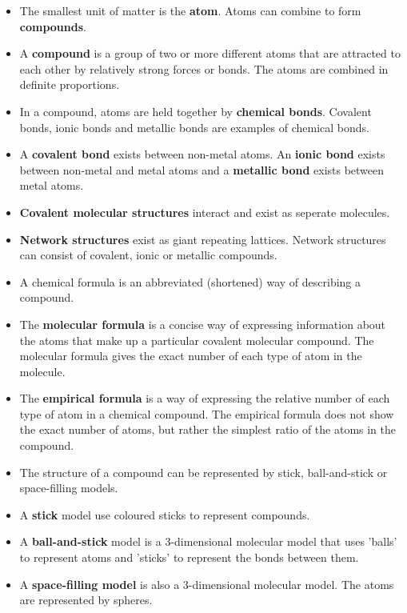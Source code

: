 \begin{itemize}[noitemsep]
\item The smallest unit of matter is the \textbf{atom}. Atoms can combine to form \textbf{compounds}.
\item A \textbf{compound} is a group of two or more different atoms that are attracted to each other by relatively strong forces or bonds. The atoms are combined in definite proportions.
\item In a compound, atoms are held together by \textbf{chemical bonds}. Covalent bonds, ionic bonds and metallic bonds are examples of chemical bonds.
\item A \textbf{covalent bond} exists between non-metal atoms. An \textbf{ionic bond} exists between non-metal and metal atoms and a \textbf{metallic bond} exists between metal atoms.
\item \textbf{Covalent molecular structures} interact and exist as seperate molecules.
\item \textbf{Network structures} exist as giant repeating lattices. Network structures can consist of covalent, ionic or metallic compounds. 
\item A chemical formula is an abbreviated (shortened) way of describing a compound.
\item The \textbf{molecular formula} is a concise way of expressing information about the atoms that make up a particular covalent molecular compound. The molecular formula gives the exact number of each type of atom in the molecule.
\item The \textbf{empirical formula} is a way of expressing the relative number of each type of atom in a chemical compound. The empirical formula does not show the exact number of atoms, but rather the simplest ratio of the atoms in the compound.
\item The structure of a compound can be represented by stick, ball-and-stick or space-filling models.
\item A \textbf{stick} model use coloured sticks to represent compounds.
\item A \textbf{ball-and-stick} model is a 3-dimensional molecular model that uses 'balls' to represent atoms and 'sticks' to represent the bonds between them.
\item A \textbf{space-filling model} is also a 3-dimensional molecular model. The atoms are represented by spheres.
\end{itemize}
\label{m38120*secfhsst!!!underscore!!!id497}
